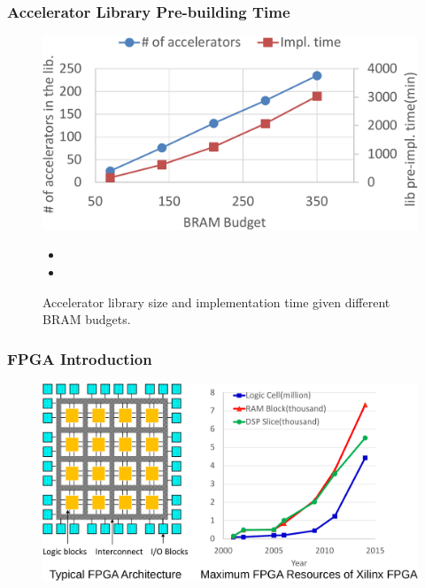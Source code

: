 \documentclass[accentcolor=tud1a,colorbacktitle,inverttitle,landscape,german,presentation,t]{tudbeamer}
\begin{document}
  \begin{frame}
  \frametitle{Accelerator Library Pre-building Time}
  \begin{figure}
  \centering
  \includegraphics[width=0.6\linewidth]{lib-impl-time}
  \caption{Accelerator library size and implementation time given different BRAM budgets.}
  \label{fig:lib-impl-time}
  \begin{itemize}
  \item \color{red}{With simple empirical constraints, the accelerator library pre-building time will not increase dramatically with the BRAM budgets. }
  \item \color{red}{The implementations are completely independent and can be done on a distributed computing system with much shorter time.}
  \end{itemize}
  \end{figure}
  \end{frame}

  \begin{frame}
  \frametitle{FPGA Introduction}
  \vspace{0.6em}
  \begin{figure}
     \includegraphics[width=.8\linewidth]{fpga-intro}
  \end{figure}
  \end{frame}
\end{document}
